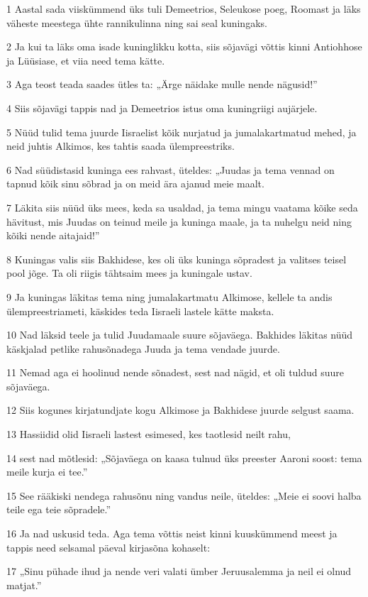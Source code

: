 \par 1 Aastal sada viiskümmend üks tuli Demeetrios, Seleukose poeg, Roomast ja läks väheste meestega ühte rannikulinna ning sai seal kuningaks.
\par 2 Ja kui ta läks oma isade kuninglikku kotta, siis sõjavägi võttis kinni Antiohhose ja Lüüsiase, et viia need tema kätte.
\par 3 Aga teost teada saades ütles ta: „Ärge näidake mulle nende nägusid!”
\par 4 Siis sõjavägi tappis nad ja Demeetrios istus oma kuningriigi aujärjele.
\par 5 Nüüd tulid tema juurde Iisraelist kõik nurjatud ja jumalakartmatud mehed, ja neid juhtis Alkimos, kes tahtis saada ülempreestriks.
\par 6 Nad süüdistasid kuninga ees rahvast, üteldes: „Juudas ja tema vennad on tapnud kõik sinu sõbrad ja on meid ära ajanud meie maalt.
\par 7 Läkita siis nüüd üks mees, keda sa usaldad, ja tema mingu vaatama kõike seda hävitust, mis Juudas on teinud meile ja kuninga maale, ja ta nuhelgu neid ning kõiki nende aitajaid!”
\par 8 Kuningas valis siis Bakhidese, kes oli üks kuninga sõpradest ja valitses teisel pool jõge. Ta oli riigis tähtsaim mees ja kuningale ustav.
\par 9 Ja kuningas läkitas tema ning jumalakartmatu Alkimose, kellele ta andis ülempreestriameti, käskides teda Iisraeli lastele kätte maksta.
\par 10 Nad läksid teele ja tulid Juudamaale suure sõjaväega. Bakhides läkitas nüüd käskjalad petlike rahusõnadega Juuda ja tema vendade juurde.
\par 11 Nemad aga ei hoolinud nende sõnadest, sest nad nägid, et oli tuldud suure sõjaväega.
\par 12 Siis kogunes kirjatundjate kogu Alkimose ja Bakhidese juurde selgust saama.
\par 13 Hassiidid olid Iisraeli lastest esimesed, kes taotlesid neilt rahu,
\par 14 sest nad mõtlesid: „Sõjaväega on kaasa tulnud üks preester Aaroni soost: tema meile kurja ei tee.”
\par 15 See rääkiski nendega rahusõnu ning vandus neile, üteldes: „Meie ei soovi halba teile ega teie sõpradele.”
\par 16 Ja nad uskusid teda. Aga tema võttis neist kinni kuuskümmend meest ja tappis need selsamal päeval kirjasõna kohaselt:
\par 17 „Sinu pühade ihud ja nende veri valati ümber Jeruusalemma ja neil ei olnud matjat.”
